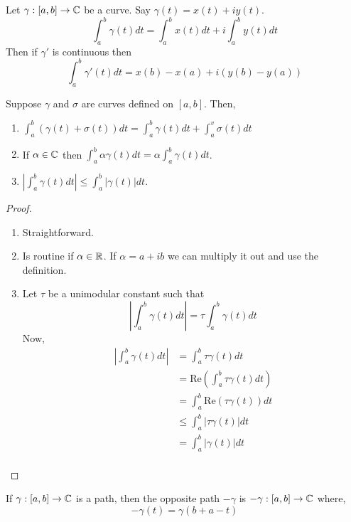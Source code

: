 \documentclass[12pt]{article}
\begin{document}
\begin{definition}
    Let $\gamma : [a, b] \to \mathbb C$ be a curve. Say $\gamma(t) = x(t) + iy(t)$.
    \[\int_a^b \gamma(t) dt = \int_a^b x(t) dt + i \int_a^b y(t) dt\]
    Then if $\gamma'$ is continuous then 
    \[\int_a^b \gamma'(t) dt = x(b) - x(a) + i(y(b) - y(a))\]
\end{definition}

\begin{proposition}
    Suppose $\gamma$ and $\sigma$ are curves defined on $[a,b]$. Then, 
    \begin{enumerate}
        \item $\int_a^b (\gamma(t) + \sigma(t)) dt = \int_a^b \gamma(t) dt + \int_a^v \sigma(t) dt$
        \item If $\alpha \in \mathbb C$ then $\int_a^b \alpha \gamma(t) dt = \alpha \int_a^b \gamma(t) dt$. 
        \item $\left| \int_a^b \gamma(t) dt \right| \leq \int_a^b |\gamma(t)| dt$. 
    \end{enumerate}
\end{proposition}

\begin{proof}

    \begin{enumerate}
        \item Straightforward. 
        \item Is routine if $\alpha \in \mathbb R$. If $\alpha = a + ib$ we can multiply it out and use the definition. 
        \item Let $\tau$ be a unimodular constant such that 
        \[\left| \int_a^b \gamma(t) dt \right| = \tau \int_a^b \gamma(t)dt\]
        Now, 
        \begin{align*}
            \left| \int_a^b \gamma(t) dt \right| &=  \int_a^b \tau \gamma(t)dt \\ 
            &= \text{Re}\left( \int_a^b \tau \gamma(t)dt \right) \\ 
            &= \int_a^b \text{Re}\left( \tau \gamma(t)\right)dt \\ 
            &\leq \int_a^b |\tau \gamma(t)|dt \\ 
            &= \int_a^b | \gamma(t)|dt \\ 
        \end{align*}
    \end{enumerate}
\end{proof}

\begin{definition}
    If $\gamma: [a,b] \to \mathbb C$ is a path, then the opposite path $-\gamma$ is $-\gamma:[a,b] \to \mathbb C$ where, 
    \[-\gamma(t) = \gamma(b+a-t)\]
\end{definition}
\end{document}
